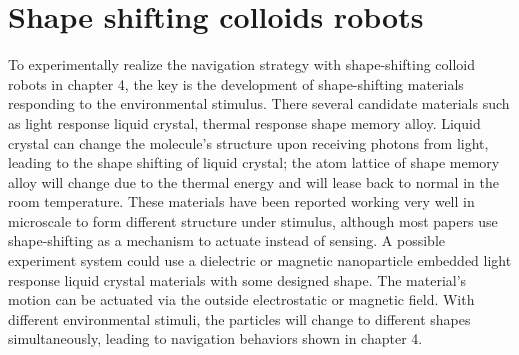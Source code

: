 \section{Shape shifting colloids robots}
To experimentally realize the navigation strategy with shape-shifting colloid robots in chapter 4, the key is the development of shape-shifting materials responding to the environmental stimulus. There several candidate materials such as  light response liquid crystal\cite{palagi2016structured}, thermal response shape memory alloy\cite{busch1991shape}. Liquid crystal can change the molecule's structure upon receiving photons from  light, leading to the shape shifting of liquid crystal; the atom lattice of shape memory alloy will change due to the thermal energy and will lease back to normal in the room temperature. These materials have been reported working very well in microscale to form different structure under stimulus\cite{breger2015self}, although most papers use shape-shifting as a mechanism to actuate instead of sensing.\cite{tu2017self,li2018light} A possible experiment system could use a dielectric or magnetic nanoparticle embedded light response liquid crystal materials with some designed shape.   The material's motion can be actuated via the outside electrostatic or magnetic field. With different environmental stimuli, the particles will change to different shapes simultaneously, leading to navigation behaviors shown in chapter 4. 

